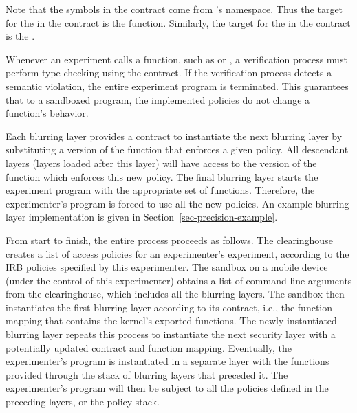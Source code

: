 Note that the symbols in the contract come from 's 
namespace. Thus the target for the  in the 
contract is the  function. Similarly, the 
target for the  in the contract is the 
.

Whenever an experiment calls a function, such as 
or , a verification process must perform 
type-checking using the contract. If the verification process 
detects a semantic violation, the entire experiment program is 
terminated. This guarantees that to a sandboxed program, 
the implemented policies do not change a function's behavior.


Each blurring layer provides a contract to instantiate the 
next blurring layer by substituting a version of the function that 
enforces a given policy. All descendant layers (layers loaded 
after this layer) will have access to the version of the function 
which enforces this new policy. The final blurring layer starts the 
experiment program with the appropriate set of functions. 
Therefore, the experimenter's program is forced to use all the 
new policies. An example blurring layer implementation is given in 
Section~\ref{sec-precision-example}.  

\bigskip
From start to finish, the entire process proceeds as follows. 
The clearinghouse creates a list of access policies for an experimenter's
experiment, according to the IRB policies specified by this 
experimenter. The sandbox on a mobile device (under the control of
this experimenter) obtains a list of command-line arguments 
from the clearinghouse, which includes all the blurring layers.
The sandbox then %
instantiates 
the first blurring layer according to its contract, i.e., the function 
mapping that contains the kernel's exported functions.
The newly instantiated blurring layer repeats this process 
to instantiate the next
security layer with a potentially updated contract and function
mapping. Eventually, the experimenter's program is instantiated
in a separate layer with the functions provided
through the stack of blurring layers that preceded it.
The experimenter's program will then be subject to all the 
policies defined in the preceding layers, or the policy stack.

